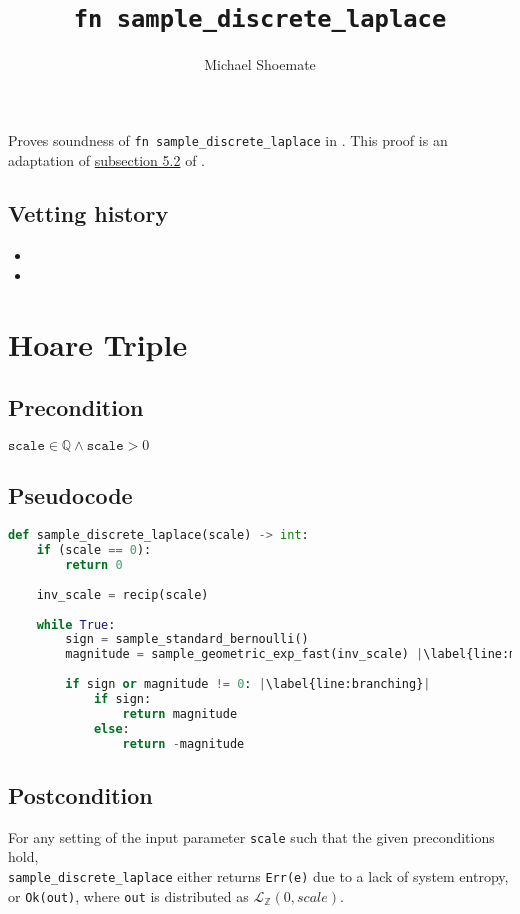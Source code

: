 \documentclass{article}
\title{\texttt{fn sample\_discrete\_laplace}}
\author{Michael Shoemate}
\begin{document}
\maketitle

\contrib
Proves soundness of \texttt{fn sample\_discrete\_laplace} in .
This proof is an adaptation of \href{https://arxiv.org/pdf/2004.00010.pdf#subsection.5.2}{subsection 5.2} of \cite{CKS20}.

\subsection*{Vetting history}
\begin{itemize}
    \item {}
    \item {}
\end{itemize}

\section{Hoare Triple}
\subsection*{Precondition}
$\texttt{scale} \in \mathbb{Q} \land \texttt{scale} > 0$

\subsection*{Pseudocode}        
\begin{lstlisting}[language=Python, escapechar=|]
def sample_discrete_laplace(scale) -> int:
    if (scale == 0):
        return 0
        
    inv_scale = recip(scale)
    
    while True:
        sign = sample_standard_bernoulli()
        magnitude = sample_geometric_exp_fast(inv_scale) |\label{line:magnitude}|
        
        if sign or magnitude != 0: |\label{line:branching}|
            if sign:
                return magnitude
            else:
                return -magnitude
\end{lstlisting}

\subsection*{Postcondition}
\label{postcondition}
For any setting of the input parameter \texttt{scale} such that the given preconditions hold, \\
\texttt{sample\_discrete\_laplace} either returns \texttt{Err(e)} due to a lack of system entropy,
or \texttt{Ok(out)}, where \texttt{out} is distributed as $\mathcal{L}_\mathbb{Z}(0, scale)$.
\end{document}
